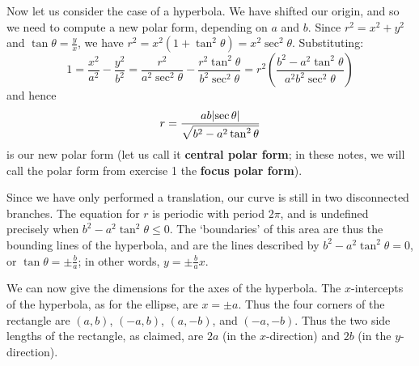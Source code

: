 \documentclass[a4paper,leqno,10pt]{article}
\theoremstyle{exercise}
\theoremstyle{plain}
\theoremstyle{definition}
\theoremstyle{remark}
\newcommand{\df}{\textbf}
\begin{document}
Now let us consider the case of a hyperbola. We have shifted our origin, and so we need to compute a new polar form, depending on $ a $
and $ b $. Since $ r^2 = x^2 + y^2 $ and $ \tan \theta = \frac{y}{x} $, we have $ r^2 = x^2(1 + \tan^2 \theta) = x^2 \sec^2 \theta $.
Substituting:
\begin{displaymath}
  1 = \frac{x^2}{a^2} - \frac{y^2}{b^2} = \frac{r^2}{a^2\sec^2 \theta} - \frac{r^2 \tan^2 \theta}{b^2\sec^2 \theta} = r^2 \left( \frac{b^2 - a^2 \tan^2 \theta}{a^2b^2 \sec^2\theta} \right)
\end{displaymath}
and hence
\begin{equation}
  r = \frac{ab \abs{\sec \theta}}{\sqrt{b^2 - a^2 \tan^2 \theta}}
\end{equation}
is our new polar form (let us call it \df{central polar form}; in these notes, we will call the polar form from exercise 1 the \df{focus polar form}).

Since we have only performed a translation, our curve is still in two disconnected branches. The equation for $ r $ is periodic with period $ 2\pi $,
and is undefined precisely when $ b^2 - a^2 \tan^2 \theta \leq 0 $. The `boundaries' of this area are thus the bounding lines of the hyperbola, and
are the lines described by $ b^2 - a^2 \tan^2 \theta = 0 $, or $ \tan \theta = \pm \frac{b}{a} $; in other words, $ y = \pm \frac{b}{a}x $.

We can now give the dimensions for the axes of the hyperbola. The $ x$-intercepts of the hyperbola, as for the ellipse, are $ x = \pm a $. Thus the
four corners of the rectangle are $ (a, b) $, $ (-a, b) $, $ (a, -b) $, and $ (-a, -b) $. Thus the two side lengths of the rectangle, as claimed,
are $ 2a $ (in the $ x$-direction) and $ 2b $ (in the $ y$-direction).
\end{document}
